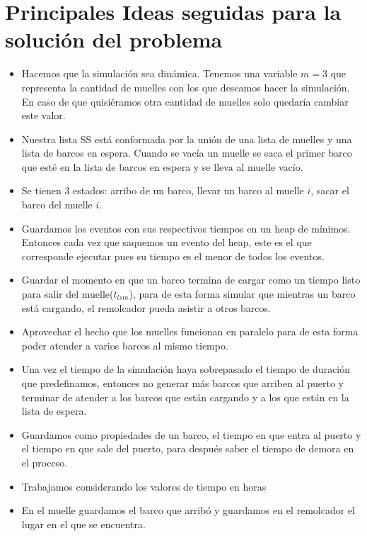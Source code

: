 \documentclass[a4paper,10pt]{article}
\begin{document}
 \section*{Principales Ideas seguidas para la solución del problema}
\begin{itemize}
	\item Hacemos que la simulación sea dinámica. Tenemos una variable $m = 3$ que representa la cantidad de muelles con los que deseamos hacer la simulación. En caso de que quisiéramos otra cantidad de muelles solo quedaría cambiar este valor.
	\item Nuestra lista SS está conformada por la unión de una lista de muelles y una lista de barcos en espera. Cuando se vacía un muelle se saca el primer barco que esté en la lista de barcos en espera y se lleva al muelle vacío.
	\item Se tienen 3 estados: arribo de un barco, llevar un barco al muelle $i$, sacar el barco del muelle $i$.
	\item Guardamos los eventos con sus respectivos tiempos en un heap de mínimos. Entonces cada vez que saquemos un evento del heap, este es el que corresponde ejecutar pues su tiempo es el menor de todos los eventos.
	\item Guardar el momento en que un barco termina de cargar como un tiempo listo para salir del muelle($t_{lsm}$), para de esta forma simular que mientras un barco está cargando, el remolcador pueda asistir a otros barcos.
	\item Aprovechar el hecho que los muelles funcionan en paralelo para de esta forma poder atender a varios barcos al mismo tiempo.
	\item Una vez el tiempo de la simulación haya sobrepasado el tiempo de duración que predefinamos, entonces no generar más barcos que arriben al puerto y terminar de atender a los barcos que están cargando y a los que están en la lista de espera.
	\item Guardamos como propiedades de un barco, el tiempo en que entra al puerto y el tiempo en que sale del puerto, para después saber el tiempo de demora en el proceso.
	\item Trabajamos considerando los valores de tiempo en horas
	\item En el muelle guardamos el barco que arribó y guardamos en el remolcador el lugar en el que se encuentra.
\end{itemize}


\end{document}

